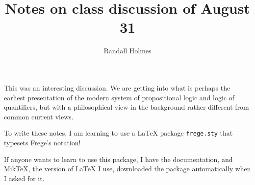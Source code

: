 \documentclass[12pt]{article}
\title{Notes on class discussion of August 31}
\author{Randall Holmes}
\begin{document}
\maketitle

This was an interesting discussion.  We are getting into what is perhaps the earliest presentation of the modern system of propositional logic and logic of quantifiers, but with a philosophical view in the background rather different from common current views.

To write these notes, I am learning to use a LaTeX package {\tt frege.sty} that typesets Frege's notation!  

If anyone wants to learn to use this package, I have the documentation, and MikTeX, the version of LaTeX I use, downloaded the package automatically when I asked for it.
\end{document}
